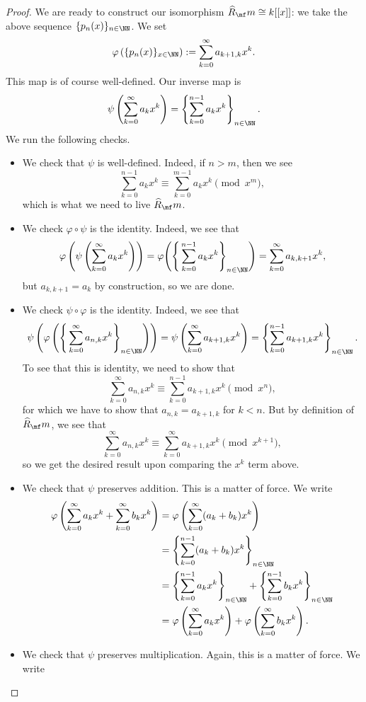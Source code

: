 \begin{proof}
	We are ready to construct our isomorphism $\widehat R_\mf m\cong k[[x]]$: we take the above sequence $\{p_n(x)\}_{n\in\NN}$. We set
	\[\varphi\left(\{p_n(x)\}_{x\in\NN}\right):=\sum_{k=0}^\infty a_{k+1,k}x^k.\]
	This map is of course well-defined. Our inverse map is
	\[\psi\left(\sum_{k=0}^\infty a_kx^k\right)=\left\{\sum_{k=0}^{n-1}a_kx^k\right\}_{n\in\NN}.\]
	We run the following checks.
	\begin{itemize}
		\item We check that $\psi$ is well-defined. Indeed, if $n>m$, then we see
		\[\sum_{k=0}^{n-1}a_kx^k\equiv\sum_{k=0}^{m-1}a_kx^k\pmod{x^m},\]
		which is what we need to live $\widehat R_\mf m$.
		\item We check $\varphi\circ\psi$ is the identity. Indeed, we see that
		\[\varphi\left(\psi\left(\sum_{k=0}^\infty a_kx^k\right)\right)=\varphi\Bigg(\Bigg\{\sum_{k=0}^{n-1}a_kx^k\Bigg\}_{n\in\NN}\Bigg)=\sum_{k=0}^\infty a_{k,k+1}x^k,\]
		but $a_{k,k+1}=a_k$ by construction, so we are done.
		\item We check $\psi\circ\varphi$ is the identity. Indeed, we see that
		\[\psi\left(\varphi\left(\Bigg\{\sum_{k=0}^\infty a_{n,k}x^k\Bigg\}_{n\in\NN}\right)\right)=\psi\left(\sum_{k=0}^\infty a_{k+1,k}x^k\right)=\left\{\sum_{k=0}^{n-1}a_{k+1,k}x^k\right\}_{n\in\NN}.\]
		To see that this is identity, we need to show that
		\[\sum_{k=0}^\infty a_{n,k}x^k\equiv\sum_{k=0}^{n-1}a_{k+1,k}x^k\pmod{x^n},\]
		for which we have to show that $a_{n,k}=a_{k+1,k}$ for $k<n$. But by definition of $\widehat R_\mf m$, we see that
		\[\sum_{k=0}^\infty a_{n,k}x^k\equiv\sum_{k=0}^\infty a_{k+1,k}x^k\pmod{x^{k+1}},\]
		so we get the desired result upon comparing the $x^k$ term above.
		\item We check that $\psi$ preserves addition. This is a matter of force. We write
		\begin{align*}
			\varphi\left(\sum_{k=0}^\infty a_kx^k+\sum_{k=0}^\infty b_kx^k\right) &= \varphi\left(\sum_{k=0}^\infty(a_k+b_k)x^k\right) \\
			&= \left\{\sum_{k=0}^{n-1}(a_k+b_k)x^k\right\}_{n\in\NN} \\
			&= \left\{\sum_{k=0}^{n-1}a_kx^k\right\}_{n\in\NN}+\left\{\sum_{k=0}^{n-1}b_kx^k\right\}_{n\in\NN} \\
			&= \varphi\left(\sum_{k=0}^\infty a_kx^k\right)+\varphi\left(\sum_{k=0}^\infty b_kx^k\right).
		\end{align*}
		\item We check that $\psi$ preserves multiplication. Again, this is a matter of force. We write

\end{itemize}
\end{proof}
